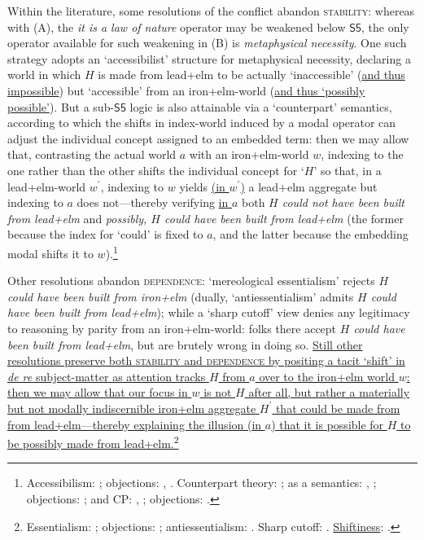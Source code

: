 \documentclass[12pt]{article}
\begin{document}
Within the literature, some resolutions of the conflict abandon
\textsc{stability}: whereas with (A), the \emph{it is a law of nature}
operator may be weakened below $\mathsf{S5}$, the only operator available for
such weakening in (B) is \emph{metaphysical necessity}. One such strategy
adopts an `accessibilist' structure for metaphysical necessity, declaring a
world in which $H$ is made from lead+elm to be actually `inaccessible'
(\ul{and thus impossible}) but
`accessible' from an iron+elm-world (\ul{and thus `possibly possible'}). But a sub-$\mathsf{S5}$ logic is also
attainable via a `counterpart' semantics, according to which the shifts in
index-world induced by a modal operator can adjust the individual concept
assigned to an embedded term: then we may allow that, contrasting the actual
world $a$ with an iron+elm-world $w$, indexing to the one rather than the
other shifts the individual concept for `$H$' so that, in a lead+elm-world
\ul{$w^{\prime}$},
indexing to $w$ yields \ul{(in $w^{\prime}$)} a lead+elm aggregate but indexing to $a$ does
not---thereby verifying \ul{in $a$} both \emph{$H$ could not have been built from
lead+elm} and \emph{possibly, $H$ could have been built from lead+elm} (the
former because the index for `could' is fixed to $a$, and the latter because
the embedding modal shifts it to $w$).\footnote{Accessibilism:
\citep{chandler76,salmon81,salmon89}; objections: \citep[pp.~246--8]{lewis86},
\citep[sec.~8.3]{williamson90}. Counterpart theory:
\citep{lewis68,lewis71cptb,Lewis93cpxap}; as a semantics:
\citep{fara08,fara12}, \citep[sec.~3.2.2]{hmw}; objections:
\citep{Hazen1979-HAZCSF,Woollaston1994-WOOCTA-3,Fara2005-FARCAA,Fara2009-FARDH};
and CP: \citep{forbes84}, \citep[p.~248]{lewis86}; objections:
\citep[sec.~8.3]{williamson90}.}

Other resolutions abandon \textsc{dependence}: `mereological essentialism'
rejects \emph{$H$ could have been built from iron+elm} (dually,
`antiessentialism' admits \emph{$H$ could have been built from lead+elm});
while a `sharp cutoff' view denies any legitimacy to reasoning by parity from
an iron+elm-world: folks there accept \emph{$H$ could have been built from
lead+elm}, but are brutely wrong in doing so.  \ul{Still other resolutions
preserve both \textsc{stability} and \textsc{dependence} by positing a tacit
`shift' in \emph{de re} subject-matter as attention tracks $H$ from $a$ over
to the iron+elm world $w$: then we may allow that our focus in $w$ is not $H$
after all, but rather a materially but not modally indiscernible iron+elm
aggregate $H^{\prime}$ that could be made from from lead+elm---thereby
explaining the illusion (in $a$) that it is possible for $H$ to be possibly
made from lead+elm.}\footnote{Essentialism:
\citep{chisholm67,Chisholm1973-CHIPAE,Chisholm1975-CHIMES,Zimmerman1992-ZIMAAF,Steen2008-STECCC-2};
objections:
\citep{Plantinga1975-PLAOME,Wiggins1979-WIGME,Kleinschmidt2014-KLEMAL};
antiessentialism: \citep{Mackie2006-MACHTM}. Sharp cutoff:
\citep{williamson90}. \ul{Shiftiness}:
\citep{Dorr2021-DORTBO-2,Leslie2011-LESEPA,RobertsonIshii2022-ROBEBT,yagisawa}.} 
\end{document}
